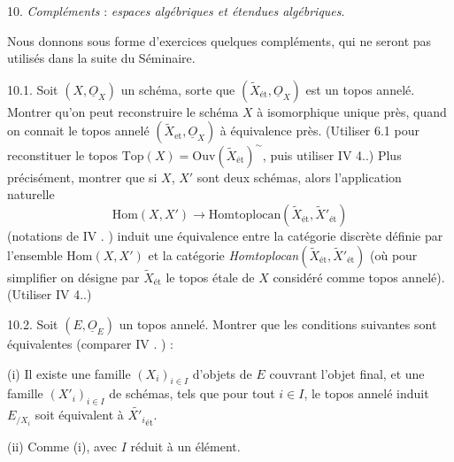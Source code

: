 \documentclass[11pt,a4paper]{article}
\begin{document}

10. \quad \emph{Compléments} : \emph{espaces algébriques et étendues
algébriques}.

Nous donnons sous forme d'exercices quelques compléments, qui ne seront pas
utilisés dans la suite du Séminaire.

10.1. \quad Soit $(X, \underline{O}_X)$ un schéma,  sorte que $(\widetilde{X}_{\text{ét}},
\underline{O}_X)$ est un topos annelé. Montrer qu'on peut reconstruire le
schéma $X$ à isomorphique unique près, quand on connait le topos annelé
$(\widetilde{X}_{\text{et}}, \underline{O}_X)$ à équivalence près. (Utiliser 6.1
pour reconstituer le topos $\mathrm{Top}(X) =
\mathrm{Ouv}(\widetilde{X}_{\text{ét}})^{\sim}$, puis utiliser IV
4..) Plus précisément, montrer que si $X$, $X'$ sont deux schémas,
alors l'application naturelle
\[
\mathrm{Hom}(X, X') \longrightarrow
\mathrm{Homtoplocan}(\widetilde{X}_{\text{ét}}, \widetilde{X}'_{\text{ét}})
\]
(notations de IV . \quad) induit une équivalence entre la catégorie
discrète définie par l'ensemble $\mathrm{Hom}(X, X')$ et la catégorie
\emph{Homtoplocan}$(\widetilde{X}_{\text{ét}}, \widetilde{X}'_{\text{ét}})$ (où pour
simplifier on désigne par $\widetilde{X}_{\text{ét}}$ le topos étale de $X$
considéré comme topos annelé). (Utiliser IV 4..)

10.2. \quad Soit $(E, \underline{O}_E)$ un topos annelé. Montrer que les
conditions suivantes sont équivalentes (comparer IV . \quad) :

(i) Il existe une famille $(X_i)_{i \in I}$ d'objets de $E$ couvrant l'objet
final, et une famille $(X'_i)_{i \in I}$ de schémas, tels que pour tout $i \in
I$, le topos annelé induit $E_{/X_i}$ soit équivalent à
$\widetilde{X'_i}_{\text{ét}}$.

(ii) Comme (i), avec $I$ réduit à un élément.
\end{document}
